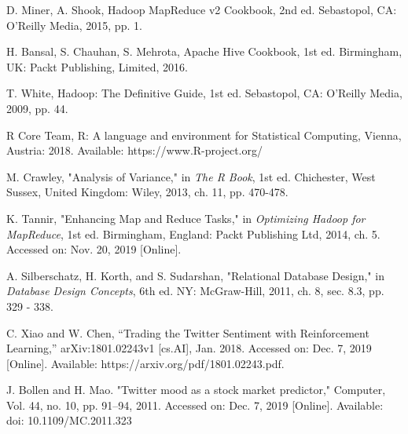 \documentclass[journal]{IEEEtran}
\begin{document}
\begin{thebibliography}{1}
D. Miner, A. Shook, Hadoop MapReduce v2 Cookbook, 2nd ed. Sebastopol, CA: O'Reilly Media,
 2015, pp. 1.

 H. Bansal, S. Chauhan, S. Mehrota, Apache Hive Cookbook, 1st ed. Birmingham, UK: Packt Publishing, Limited, 2016.

T. White, Hadoop: The Definitive Guide, 1st ed. Sebastopol,
 CA: O'Reilly Media, 2009, pp. 44.

R Core Team, R: A language and environment for Statistical Computing, Vienna, Austria: 2018.
 Available: https://www.R-project.org/

M. Crawley, "Analysis of Variance," in \textit{The R Book},
 1st ed. Chichester, West Sussex, United Kingdom: Wiley, 2013,
 ch. 11, pp. 470-478.

K. Tannir, "Enhancing Map and Reduce Tasks," in 
 \textit{Optimizing Hadoop for MapReduce},
 1st ed. Birmingham, England: Packt Publishing Ltd, 2014,
 ch. 5. Accessed on: Nov. 20, 2019 [Online]. 
 
A. Silberschatz, H. Korth, and S. Sudarshan, "Relational Database Design," in
 \textit{Database Design Concepts}, 6th ed. NY: McGraw-Hill, 2011, ch. 8, sec. 8.3,
 pp. 329 - 338. 

C. Xiao and W. Chen, “Trading the Twitter Sentiment with Reinforcement Learning,”
 arXiv:1801.02243v1 [cs.AI], Jan. 2018. Accessed on: Dec. 7, 2019 [Online].
 Available: https://arxiv.org/pdf/1801.02243.pdf.

J. Bollen and H. Mao. "Twitter mood as a stock market predictor,"
 Computer, Vol. 44, no. 10, pp. 91–94, 2011. Accessed on: Dec. 7, 2019 [Online].
 Available: doi: 10.1109/MC.2011.323


\end{thebibliography}



\end{document}
